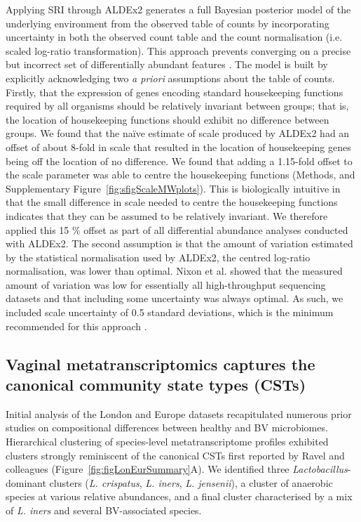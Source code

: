 \documentclass[sn-mathphys,Numbered]{sn-jnl}%
\begin{document}
Applying SRI through ALDEx2 generates a full Bayesian posterior model of the underlying environment from the observed table of counts by incorporating uncertainty in both the observed count table and the count normalisation (i.e. scaled log-ratio transformation). This approach prevents converging on a precise but incorrect set of differentially abundant features \citep{nixon2023scale}. The model is built by explicitly acknowledging two \textit{a priori} assumptions about the table of counts. Firstly, that the expression of genes encoding standard housekeeping functions required by all organisms should be relatively invariant between groups; that is, the location of housekeeping functions should exhibit no difference between groups. We found that the na\"{i}ve estimate of scale produced by ALDEx2 had an offset of about 8-fold in scale that resulted in the location of housekeeping genes being off the location of no difference. We found that adding a 1.15-fold offset to the scale parameter was able to centre the housekeeping functions (Methods, and Supplementary Figure~\ref{fig:sfigScaleMWplots}). This is biologically intuitive in that the small difference in scale needed to centre the housekeeping functions indicates that they can be assumed to be relatively invariant. We therefore applied this 15 \% offset as part of all differential abundance analyses conducted with ALDEx2. The second assumption is that the amount of variation estimated by the statistical normalisation used by ALDEx2, the centred log-ratio normalisation, was lower than optimal. Nixon et al. \citep{nixon2023scale} showed that the measured amount of variation was low for essentially all high-throughput sequencing datasets and that including some uncertainty was always optimal. As such, we included scale uncertainty of 0.5 standard deviations, which is the minimum recommended for this approach \citep{gloorScale}.

\subsection{Vaginal metatranscriptomics captures the canonical community state types (CSTs)}\label{subsec:subsecCSTs}
Initial analysis of the London and Europe datasets recapitulated numerous prior studies on compositional differences between healthy and BV microbiomes. Hierarchical clustering of species-level metatranscriptome profiles exhibited clusters strongly reminiscent of the canonical CSTs first reported by Ravel and colleagues \cite{Ravel:2010} (Figure~\ref{fig:figLonEurSummary}A). We identified three \textit{Lactobacillus}-dominant clusters (\textit{L. crispatus}, \textit{L. iners}, \textit{L. jensenii}), a cluster of anaerobic species at various relative abundances, and a final cluster characterised by a mix of \textit{L. iners} and several BV-associated species. 
\end{document}
